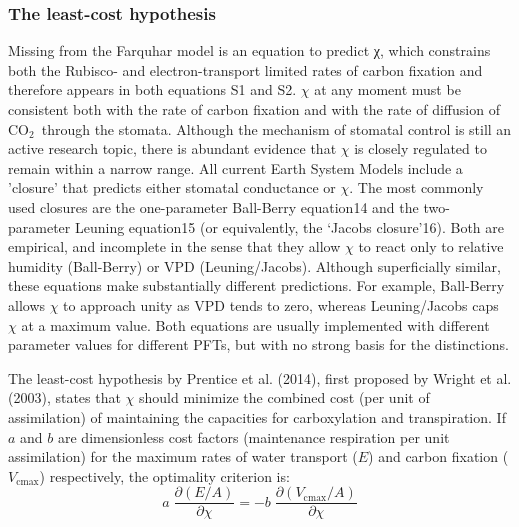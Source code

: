 \documentclass{myreport}
\newcommand{\coo}{CO$_2$}
\begin{document}
\subsubsection{The least-cost hypothesis}
\label{sec:least-cost}
Missing from the Farquhar model is an equation to predict χ, which constrains both the Rubisco- and electron-transport limited rates of carbon fixation and therefore appears in both equations S1 and S2. 
$\chi$ at any moment must be consistent both with the rate of carbon fixation and with the rate of diffusion of \coo\ through the stomata. 
Although the mechanism of stomatal control is still an active research topic, there is abundant evidence that $\chi$ is closely regulated to remain within a narrow range. 
All current Earth System Models include a 'closure' that predicts either stomatal conductance or $\chi$. 
The most commonly used closures are the one-parameter Ball-Berry equation14 and the two-parameter Leuning equation15 (or equivalently, the ‘Jacobs closure’16). 
Both are empirical, and incomplete in the sense that they allow $\chi$ to react only to relative humidity (Ball-Berry) or VPD (Leuning/Jacobs). 
Although superficially similar, these equations make substantially different predictions. 
For example, Ball-Berry allows $\chi$ to approach unity as VPD tends to zero, whereas Leuning/Jacobs caps $\chi$ at a maximum value. 
Both equations are usually implemented with different parameter values for different PFTs, but with no strong basis for the distinctions.

The least-cost hypothesis by Prentice et al. (2014), first proposed by Wright et al. (2003), states that $\chi$ should minimize the combined cost (per unit of assimilation) of maintaining the capacities for carboxylation and transpiration. 
If $a$ and $b$ are dimensionless cost factors (maintenance respiration per unit assimilation) for the maximum rates of water transport ($E$) and carbon fixation ($V_{\mathrm{cmax}}$) respectively, the optimality criterion is:
\begin{equation}
\label{eq:leastcost}
    a \; \frac{\partial (E/A)}{\partial \chi} = -b \; \frac{\partial (V_{\mathrm{cmax}}/A)}{\partial \chi}
\end{equation}
\end{document}
